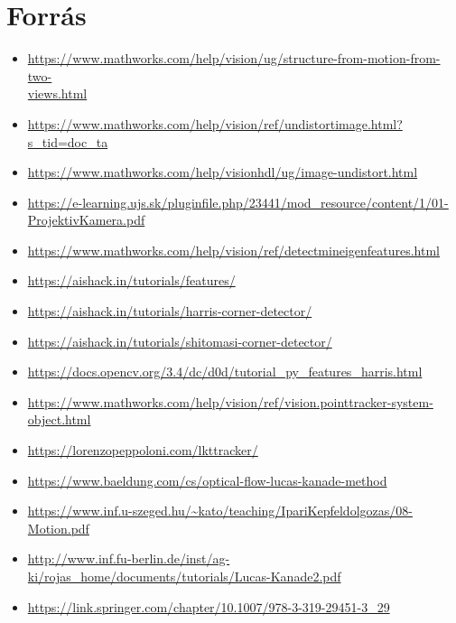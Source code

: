 \documentclass[12pt]{report}
\begin{document}
    \chapter{Forrás}
        \begin{itemize}
            \item \url{https://www.mathworks.com/help/vision/ug/structure-from-motion-from-two-}\\\url{views.html}
            \item \url{https://www.mathworks.com/help/vision/ref/undistortimage.html?s_tid=doc_ta}
            \item \url{https://www.mathworks.com/help/visionhdl/ug/image-undistort.html}
            \item \url{https://e-learning.ujs.sk/pluginfile.php/23441/mod_resource/content/1/01-ProjektivKamera.pdf}
            \item \url{https://www.mathworks.com/help/vision/ref/detectmineigenfeatures.html}
            \item \url{https://aishack.in/tutorials/features/}
            \item \url{https://aishack.in/tutorials/harris-corner-detector/}
            \item \url{https://aishack.in/tutorials/shitomasi-corner-detector/}
            \item \url{https://docs.opencv.org/3.4/dc/d0d/tutorial_py_features_harris.html}
            \item \url{https://www.mathworks.com/help/vision/ref/vision.pointtracker-system-object.html}
            \item \url{https://lorenzopeppoloni.com/lkttracker/}
            \item \url{https://www.baeldung.com/cs/optical-flow-lucas-kanade-method}
            \item \url{https://www.inf.u-szeged.hu/~kato/teaching/IpariKepfeldolgozas/08-Motion.pdf}
            \item \url{http://www.inf.fu-berlin.de/inst/ag-ki/rojas_home/documents/tutorials/Lucas-Kanade2.pdf}
            \item \url{https://link.springer.com/chapter/10.1007/978-3-319-29451-3_29}
        \end{itemize}
\end{document}

